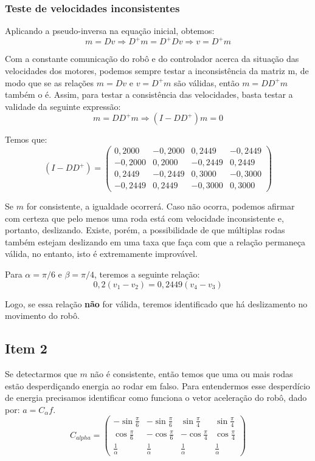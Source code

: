 \documentclass{article}
\begin{document}
\subsubsection{Teste de velocidades inconsistentes}

\hspace{1cm} Aplicando a pseudo-inversa na equação inicial, obtemos:
\[ m = Dv \Rightarrow D^+m = D^+Dv \Rightarrow v = D^+m\]

Com a constante comunicação do robô e do controlador acerca da situação das velocidades dos motores, podemos sempre testar a inconsistência da matriz m, de modo que se as relações $m = Dv$ e $v = D^+m$ são válidas, então $m = DD^+m$ também o é. Assim, para testar a consistência das velocidades, basta testar a validade da seguinte expressão:
\[ m = DD^+m \Rightarrow (I - DD^+)m = 0\]

Temos que:
\[(I - DD^+)
=
\begin{pmatrix}
  0,2000    &-0,2000    & 0,2449    & -0,2449    \\
 -0,2000 &  0,2000 & -0,2449 & 0,2449 \\
 0,2449 & -0,2449 &  0,3000  & -0,3000 \\
 -0,2449 & 0,2449 & -0,3000  & 0,3000
 \end{pmatrix}
\]


Se $m$ for consistente, a igualdade ocorrerá. Caso não ocorra, podemos afirmar com certeza que pelo menos uma roda está com velocidade inconsistente e, portanto, deslizando. Existe, porém, a possibilidade de que múltiplas rodas também estejam deslizando em uma taxa que faça com que a relação permaneça válida, no entanto, isto é extremamente improvável.

Para $\alpha = \pi/6$ e $\beta = \pi/4$, teremos a seguinte relação:
\[0,2(v_1 - v_2) = 0,2449(v_4 - v_3)\]

Logo, se essa relação \textbf{não} for válida, teremos identificado que há deslizamento no movimento do robô.

\subsection{Item 2}

\hspace{1cm}Se detectarmos que $m$ não é consistente, então temos que uma ou mais rodas estão desperdiçando energia ao rodar em falso. Para entendermos esse desperdício de energia precisamos identificar como funciona o vetor aceleração do robô, dado por: $ a = C_{\alpha}f$.
\[C_{alpha}
=
\begin{pmatrix}
  -\sin{\frac{\pi}{6}} & -\sin{\frac{\pi}{6}} & \sin{\frac{\pi}{4}} & \sin{\frac{\pi}{4}} \\
  \cos{\frac{\pi}{6}} &  -\cos{\frac{\pi}{6}} &  -\cos{\frac{\pi}{4}} &  \cos{\frac{\pi}{4}} \\
 \frac{1}{\alpha} & \frac{1}{\alpha} &\frac{1}{\alpha} & \frac{1}{\alpha}
 \end{pmatrix}
\]
\end{document}
